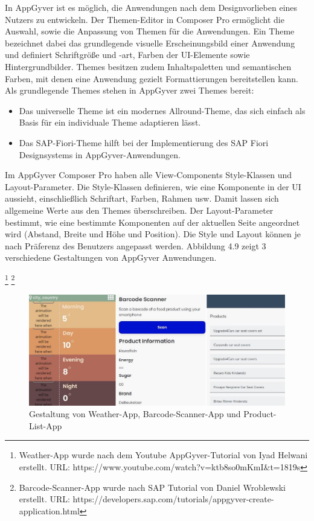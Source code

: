 In AppGyver ist es möglich, die Anwendungen nach dem Designvorlieben eines Nutzers zu entwickeln. Der Themen-Editor in Composer Pro ermöglicht die Auswahl, sowie die Anpassung von Themen für die Anwendungen. Ein Theme bezeichnet dabei das grundlegende visuelle Erscheinungsbild einer Anwendung und definiert Schriftgröße und -art, Farben der UI-Elemente sowie Hintergrundbilder\cite{hel:the}. Themes besitzen zudem Inhaltspaletten und semantischen Farben, mit denen eine Anwendung gezielt Formattierungen bereitstellen kann\cite{appg:the}. Als grundlegende Themes stehen in AppGyver zwei Themes bereit: 

\begin{itemize}[noitemsep]
\item Das universelle Theme ist ein modernes Allround-Theme, das sich einfach als Basis für ein individuale Theme adaptieren lässt.
\item Das SAP-Fiori-Theme hilft bei der Implementierung des SAP Fiori Designsystems in AppGyver-Anwendungen\cite{har:new}.
\end{itemize}

Im AppGyver Composer Pro haben alle View-Components Style-Klassen und Layout-Parameter. Die Style-Klassen definieren, wie eine Komponente in der UI aussieht, einschließlich Schriftart, Farben, Rahmen usw. Damit lassen sich allgemeine Werte aus den Themes überschreiben. Der Layout-Parameter bestimmt, wie eine bestimmte Komponenten auf der aktuellen Seite angeordnet wird (Abstand, Breite und Höhe und Position). Die Style und Layout können je nach Präferenz des Benutzers angepasst werden. Abbildung 4.9 zeigt 3 verschiedene Gestaltungen von AppGyver Anwendungen.

\footnote{\label{1}Weather-App wurde nach dem Youtube AppGyver-Tutorial von Iyad Helwani erstellt. URL: https://www.youtube.com/watch?v=ktb8so0mKmI\&t=1819s} 
\footnote{\label{2}Barcode-Scanner-App wurde nach SAP Tutorial von Daniel Wroblewski erstellt. URL: https://developers.sap.com/tutorials/appgyver-create-application.html}
\begin{figure}[htbp]
 \centering
 \includegraphics[width=1.0\textwidth]{Bilder/appgyver/4_9_1_gestaltung.jpg}
 \caption{Gestaltung von Weather-App, Barcode-Scanner-App und Product-List-App}
\end{figure}

